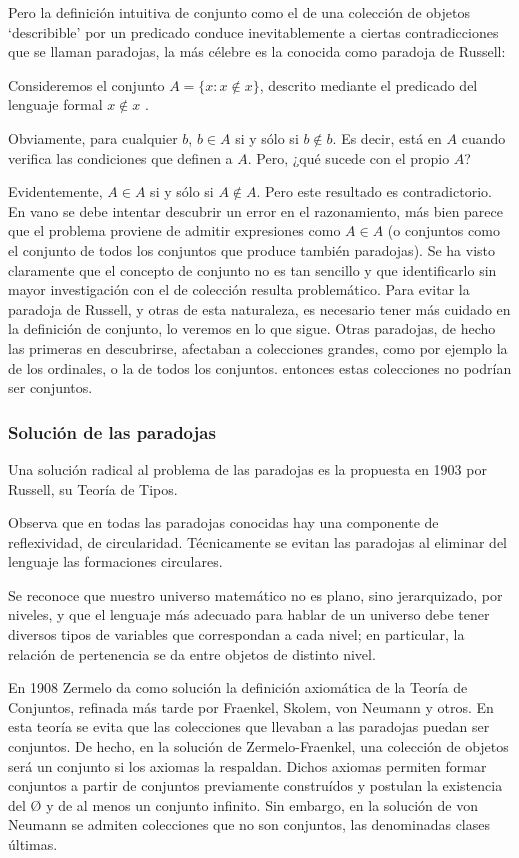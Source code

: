 Pero la definición intuitiva de conjunto como el de una colección
de objetos ‘describible’ por un predicado conduce inevitablemente
a ciertas contradicciones que se llaman paradojas, la más célebre
es la conocida como paradoja de Russell: 

Consideremos el conjunto $A=\{x:x\notin x\}$, descrito mediante el
predicado del lenguaje formal $x\notin x$ . 

Obviamente, para cualquier $b$, $b\in A$ si y sólo si $b\notin b$.
Es decir, está en $A$ cuando verifica las condiciones que definen
a $A$. Pero, ¿qué sucede con el propio $A$? 

Evidentemente, $A\in A$ si y sólo si $A\notin A$. Pero este resultado
es contradictorio. En vano se debe intentar descubrir un error en
el razonamiento, más bien parece que el problema proviene de admitir
expresiones como $A\in A$ (o conjuntos como el conjunto de todos
los conjuntos que produce también paradojas). Se ha visto claramente
que el concepto de conjunto no es tan sencillo y que identificarlo
sin mayor investigación con el de colección resulta problemático.
Para evitar la paradoja de Russell, y otras de esta naturaleza, es
necesario tener más cuidado en la definición de conjunto, lo veremos
en lo que sigue. Otras paradojas, de hecho las primeras en descubrirse,
afectaban a colecciones grandes, como por ejemplo la de los ordinales,
o la de todos los conjuntos. entonces estas colecciones no podrían
ser conjuntos. 

\subsubsection{Solución de las paradojas}

Una solución radical al problema de las paradojas es la propuesta
en 1903 por Russell, su Teoría de Tipos. 

Observa que en todas las paradojas conocidas hay una componente de
reflexividad, de circularidad. Técnicamente se evitan las paradojas
al eliminar del lenguaje las formaciones circulares.

Se reconoce que nuestro universo matemático no es plano, sino jerarquizado,
por niveles, y que el lenguaje más adecuado para hablar de un universo
debe tener diversos tipos de variables que correspondan a cada nivel;
en particular, la relación de pertenencia se da entre objetos de distinto
nivel. 

En 1908 Zermelo da como solución la definición axiomática de la Teoría
de Conjuntos, refinada más tarde por Fraenkel, Skolem, von Neumann
y otros. En esta teoría se evita que las colecciones que llevaban
a las paradojas puedan ser conjuntos. De hecho, en la solución de
Zermelo-Fraenkel, una colección de objetos será un conjunto si los
axiomas la respaldan. Dichos axiomas permiten formar conjuntos a partir
de conjuntos previamente construídos y postulan la existencia del
$\textrm{Ø}$ y de al menos un conjunto infinito. Sin embargo, en
la solución de von Neumann se admiten colecciones que no son conjuntos,
las denominadas clases últimas.

